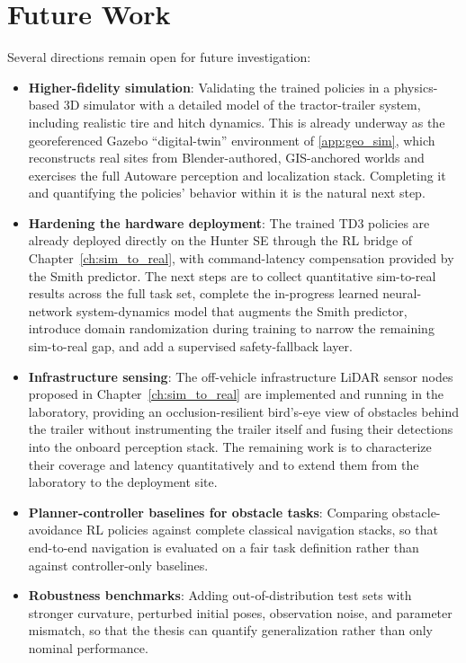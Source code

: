 \section{Future Work}

Several directions remain open for future investigation:
\begin{itemize}
    \item \textbf{Higher-fidelity simulation}: Validating the trained policies in a physics-based 3D simulator with a detailed model of the tractor-trailer system, including realistic tire and hitch dynamics. This is already underway as the georeferenced Gazebo ``digital-twin'' environment of \cref{app:geo_sim}, which reconstructs real sites from Blender-authored, GIS-anchored worlds and exercises the full Autoware perception and localization stack. Completing it and quantifying the policies' behavior within it is the natural next step.
    \item \textbf{Hardening the hardware deployment}: The trained TD3 policies are already deployed directly on the Hunter SE through the RL bridge of Chapter~\ref{ch:sim_to_real}, with command-latency compensation provided by the Smith predictor. The next steps are to collect quantitative sim-to-real results across the full task set, complete the in-progress learned neural-network system-dynamics model that augments the Smith predictor, introduce domain randomization during training to narrow the remaining sim-to-real gap, and add a supervised safety-fallback layer.
    \item \textbf{Infrastructure sensing}: The off-vehicle infrastructure LiDAR sensor nodes proposed in Chapter~\ref{ch:sim_to_real} are implemented and running in the laboratory, providing an occlusion-resilient bird's-eye view of obstacles behind the trailer without instrumenting the trailer itself and fusing their detections into the onboard perception stack. The remaining work is to characterize their coverage and latency quantitatively and to extend them from the laboratory to the deployment site.
    \item \textbf{Planner-controller baselines for obstacle tasks}: Comparing obstacle-avoidance RL policies against complete classical navigation stacks, so that end-to-end navigation is evaluated on a fair task definition rather than against controller-only baselines.
    \item \textbf{Robustness benchmarks}: Adding out-of-distribution test sets with stronger curvature, perturbed initial poses, observation noise, and parameter mismatch, so that the thesis can quantify generalization rather than only nominal performance.

\end{itemize}
